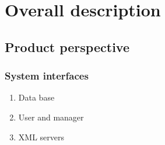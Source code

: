 \section{Overall description}


\subsection{Product perspective}


\subsubsection{System interfaces}

\begin{enumerate}
  \item Data base
  \item User and manager
  \item XML servers
\end{enumerate}

